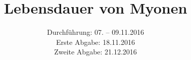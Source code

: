 

\subject{Versuch 01}
\title{Lebensdauer von Myonen}
\date{Durchführung: 07. -- 09.11.2016 \\
      Erste Abgabe: 18.11.2016 \\
      Zweite Abgabe: 21.12.2016}



\maketitle
\newpage








\printbibliography



